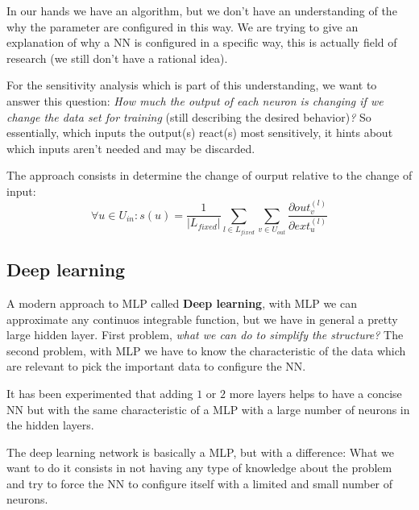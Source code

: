 \documentclass{article}
\begin{document}
In our hands we have an algorithm, but we don't have an understanding of the why the parameter
are configured in this way. We are trying to give an explanation of why a NN is configured in a specific way,
this is actually field of research (we still don't have a rational idea).

For the sensitivity analysis which is part of this understanding, we want to answer this question: \textit{How much
    the output of each neuron is changing if we change the data set for training}
(still describing the desired behavior)\textit{?}
So essentially, which inputs the output(s) react(s) most sensitively, it hints about which inputs aren't needed
and may be discarded.

The approach consists in determine the change of ourput relative to the change of input:
$$\forall u\in U_{in}:
    s(u)=\frac{1}{|L_{fixed}|} \sum_{l\in L_{fixed}} \sum_{v\in U_{out}} \frac{\partial out_v^{(l)}}{\partial ext_u^{(l)}}$$

\subsection{Deep learning}
A modern approach to MLP called \textbf{Deep learning}, with MLP we can approximate any continuos integrable
function, but we have in general a pretty large hidden layer. First problem, \textit{what we can do to
    simplify the structure?} The second problem, with MLP we have to know the characteristic of the data which are
relevant to pick the important data to configure the NN.

It has been experimented that adding $1$ or $2$ more layers helps to have a concise NN but with
the same characteristic of a MLP with a large number of neurons in the hidden layers.

The deep learning network is basically a MLP, but with a difference: What we want to do it consists
in not having any type of knowledge about the problem and try to force the NN to configure itself with
a limited and small number of neurons.
\end{document}
